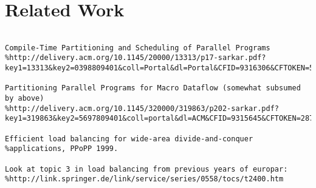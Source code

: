 \section{Related Work}

\begin{verbatim}

Compile-Time Partitioning and Scheduling of Parallel Programs
%http://delivery.acm.org/10.1145/20000/13313/p17-sarkar.pdf?key1=13313&key2=0398809401&coll=Portal&dl=Portal&CFID=9316306&CFTOKEN=51649022

Partitioning Parallel Programs for Macro Dataflow (somewhat subsumed by above)
%http://delivery.acm.org/10.1145/320000/319863/p202-sarkar.pdf?key1=319863&key2=5697809401&coll=portal&dl=ACM&CFID=9315645&CFTOKEN=28761144

Efficient load balancing for wide-area divide-and-conquer
%applications, PPoPP 1999.

Look at topic 3 in load balancing from previous years of europar:
%http://link.springer.de/link/service/series/0558/tocs/t2400.htm

\end{verbatim}